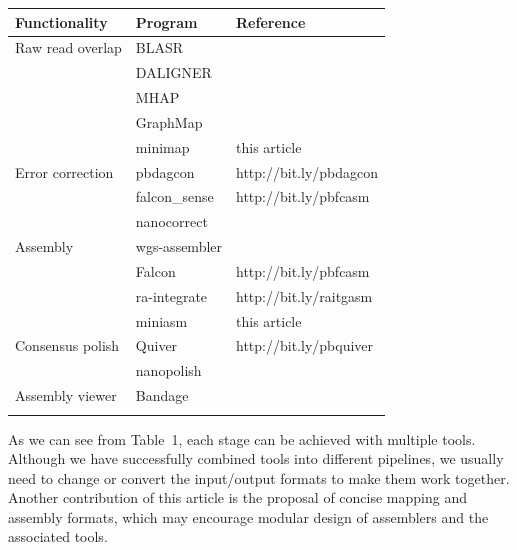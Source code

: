\documentclass{bioinfo}
\begin{document}
\begin{table}[b]
{\footnotesize
\begin{tabular}{p{2.4cm}p{2cm}l}
\toprule
Functionality & Program & Reference \\
\midrule
Raw read overlap & BLASR & \citet{Chaisson:2012aa}\\
& DALIGNER & \citet{DBLP:conf/wabi/Myers14} \\
& MHAP & \citet{Berlin:2015xy} \\
& GraphMap & \citet{sovic:2015aa} \\
& minimap & this article \\
Error correction & pbdagcon & http://bit.ly/pbdagcon \\
& falcon\_sense & http://bit.ly/pbfcasm \\
& nanocorrect & \citet{Loman:2015xu} \\
Assembly & wgs-assembler & \citet{Myers:2000kl} \\
& Falcon & http://bit.ly/pbfcasm \\
& ra-integrate & http://bit.ly/raitgasm \\
& miniasm & this article \\
Consensus polish & Quiver & http://bit.ly/pbquiver \\
& nanopolish & \citet{Loman:2015xu} \\
Assembly viewer & Bandage & \citet{Wick:2015qf}\\
\botrule
\end{tabular}
}{}
\end{table}

As we can see from Table~1, each stage can be achieved with multiple tools.
Although we have successfully combined tools into different pipelines, we
usually need to change or convert the input/output formats to make them work
together. Another contribution of this article is the proposal of concise
mapping and assembly formats, which may encourage modular design of assemblers
and the associated tools.
\end{document}
